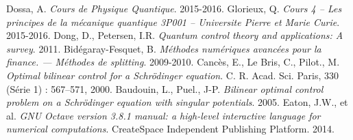 \begin{thebibliography}{KNU90}
\vspace{0.5cm}
 Dossa, A.
\emph{Cours de Physique Quantique}. 2015-2016.
\vspace{0.5cm}
 Glorieux, Q.
\emph{Cours 4 – Les principes de la mécanique quantique
3P001 – Universite Pierre et Marie Curie}. 2015-2016.
\vspace{0.5cm}
 Dong, D., Petersen, I.R.
\emph{Quantum control theory and applications: A survey}. 2011.
\vspace{0.5cm}
 Bidégaray-Fesquet, B.
\emph{Méthodes numériques avancées pour la finance. — Méthodes de splitting}. 2009-2010.
\vspace{0.5cm}
 Cancès, E., Le Bris, C., Pilot., M.
\emph{Optimal bilinear control for a Schrödinger equation}. C. R. Acad. Sci. Paris, 330 (Série 1) : 567–571, 2000.
\vspace{0.5cm}
 Baudouin, L., Puel., J-P.
\emph{Bilinear optimal control problem on a Schrödinger equation with singular potentials}. 2005.
\vspace{0.5cm}
 Eaton, J.W., et al.
\emph{GNU Octave version 3.8.1 manual: a high-level interactive language for numerical computations}. CreateSpace Independent Publishing Platform. 2014.
\end{thebibliography}
